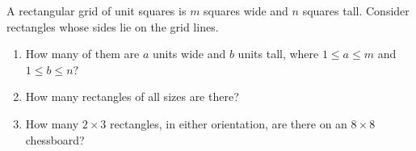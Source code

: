 A rectangular grid of unit squares is $m$ squares wide and $n$ squares tall. Consider rectangles whose sides lie on the grid lines.
\begin{enumerate}
\item[(a)] How many of them are $a$ units wide and $b$ units tall, where $1\le a\le m$ and $1\le b\le n$?
\item[(b)] How many rectangles of all sizes are there?
\item[(c)] How many $2\times3$ rectangles, in either orientation, are there on an $8\times8$ chessboard?
\end{enumerate}
